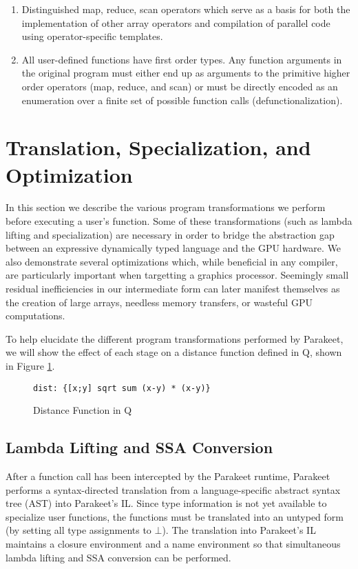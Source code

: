 \documentclass[preprint]{sigplanconf}
\begin{document}
\begin{enumerate}
\item Distinguished map, reduce, scan operators which serve as a basis for both the implementation of other array 
 operators and compilation of parallel code using operator-specific templates.  
\item All user-defined functions have first order types. Any function arguments in the original program 
 must either end up as arguments to the primitive higher order operators (map, reduce, and scan) or
 must be directly encoded as an enumeration over a finite set of possible function calls (defunctionalization). 
\end{enumerate}

\section{Translation, Specialization, and Optimization}
\label{Compilation}
In this section we describe the various program transformations we perform
before executing a user's function. Some of these transformations (such as
lambda lifting and specialization) are necessary in order to bridge the
abstraction gap between an expressive dynamically typed language and the GPU
hardware. We also demonstrate several optimizations which, while beneficial in
any compiler, are particularly important when targetting a graphics processor.
Seemingly small residual inefficiencies in our intermediate form can later
manifest themselves as the creation of large arrays, needless memory transfers,
or wasteful GPU computations.

To help elucidate the different program transformations performed by Parakeet,
we will show the effect of each stage on a distance function defined in Q,
shown in Figure \ref{QDist}.

\begin{figure}[h!]
    \begin{lstlisting}[numbers=none]
    dist: {[x;y] sqrt sum (x-y) * (x-y)}
    \end{lstlisting}
    \caption{Distance Function in Q}
    \label{QDist}
\end{figure}

\subsection{Lambda Lifting and SSA Conversion } 
After a function call has been
intercepted by the Parakeet runtime, Parakeet
performs a syntax-directed translation from a
language-specific abstract syntax tree (AST) into Parakeet's IL. 
Since type information is not yet
available to specialize user functions, the
functions must be translated into an untyped
form (by setting all type assignments to $\bot$). The translation into
Parakeet's IL maintains a closure environment and a name environment so that
simultaneous lambda lifting and SSA conversion can be performed.
\end{document}
